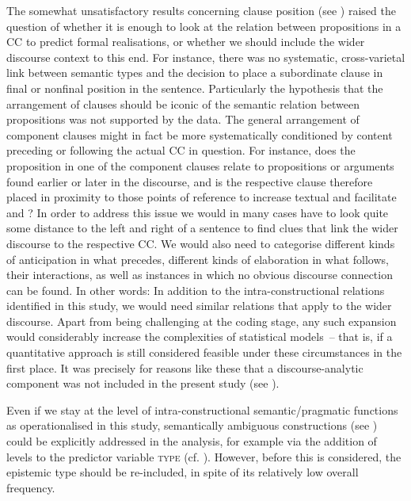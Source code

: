 The somewhat unsatisfactory results concerning clause position (see ) raised the question of whether it is enough to look at the relation between propositions in a CC to predict formal realisations, or whether we should include the wider discourse context to this end. For instance, there was no systematic, cross-varietal link between semantic types and the decision to place a subordinate clause in final or nonfinal position in the sentence. Particularly the hypothesis that the arrangement of clauses should be iconic of the semantic relation between propositions was not supported by the data. The general arrangement of component clauses might in fact be more systematically conditioned by content preceding or following the actual CC in question. For instance, does the proposition in one of the component clauses relate to propositions or arguments found earlier or later in the discourse, and is the respective clause therefore placed in proximity to those points of reference to increase textual  and facilitate  and ? In order to address this issue we would in many cases have to look quite some distance to the left and right of a sentence to find clues that link the wider discourse to the respective CC. We would also need to categorise different kinds of anticipation in what precedes, different kinds of elaboration in what follows, their interactions, as well as instances in which no obvious discourse connection can be found. In other words: In addition to the intra-constructional relations identified in this study, we would need similar relations that apply to the wider discourse. Apart from being challenging at the coding stage, any such expansion would considerably increase the complexities of statistical models~– that is, if a quantitative approach is still considered feasible under these circumstances in the first place. It was precisely for reasons like these that a discourse-analytic component was not included in the present study (see ).

Even if we stay at the level of intra-constructional semantic/pragmatic functions as operationalised in this study, semantically ambiguous constructions (see ) could be explicitly addressed in the analysis, for example via the addition of levels to the predictor variable \textsc{type} (cf. ). However, before this is considered, the epistemic type should be re-included, in spite of its relatively low overall frequency.

